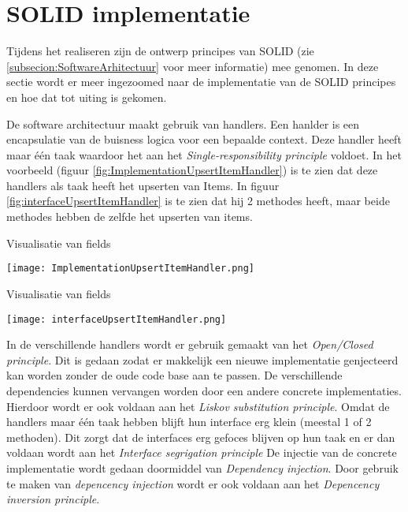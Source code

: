\section{SOLID implementatie}
Tijdens het realiseren zijn de ontwerp principes van SOLID (zie \ref{subsecion:SoftwareArhitectuur} voor meer informatie) mee genomen.
In deze sectie wordt er meer ingezoomed naar de implementatie van de SOLID principes en hoe dat tot uiting is gekomen.

\whitespace
De software architectuur maakt gebruik van handlers.
Een hanlder is een encapsulatie van de buisness logica voor een bepaalde context.
Deze handler heeft maar één taak waardoor het aan het \textit{Single-responsibility principle} voldoet.
In het voorbeeld (figuur \ref{fig:ImplementationUpsertItemHandler}) is te zien dat deze handlers als taak heeft het upserten van Items.
In figuur \ref{fig:interfaceUpsertItemHandler} is te zien dat hij 2 methodes heeft, maar beide methodes hebben de zelfde  het upserten van items.

\whitespace
\begin{graphic}
    \captionsetup{type=figure}
    \caption{Visualisatie van fields}
    \texttt{[image: ImplementationUpsertItemHandler.png]}
    \label{fig:ImplementationUpsertItemHandler}
\end{graphic}

\whitespace[2]
\begin{graphic}
    \captionsetup{type=figure}
    \caption{Visualisatie van fields}
    \texttt{[image: interfaceUpsertItemHandler.png]}
    \label{fig:interfaceUpsertItemHandler}
\end{graphic}

\whitespace[2]
In de verschillende handlers wordt er gebruik gemaakt van het \textit{Open\slash Closed principle}.
Dit is gedaan zodat er makkelijk een nieuwe implementatie genjecteerd kan worden zonder de oude code base aan te passen.
De verschillende dependencies kunnen vervangen worden door een andere concrete implementaties.
Hierdoor wordt er ook voldaan aan het \textit{Liskov substitution principle}.
Omdat de handlers maar één taak hebben blijft hun interface erg klein (meestal 1 of 2 methoden).
Dit zorgt dat de interfaces erg gefoces blijven op hun taak en er dan voldaan wordt aan het \textit{Interface segrigation principle}
De injectie van de concrete implementatie wordt gedaan doormiddel van \textit{Dependency injection}.
Door gebruik te maken van \textit{depencency injection} wordt er ook voldaan aan het \textit{Depencency inversion principle}.

